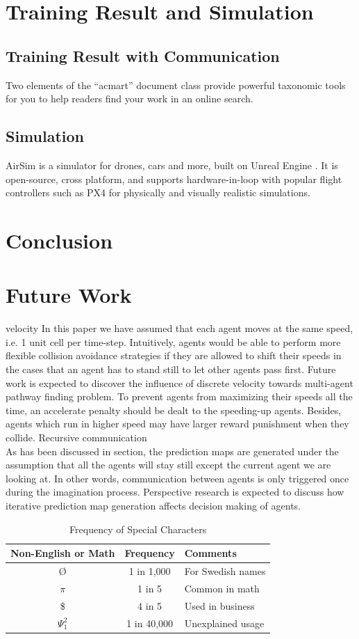 \documentclass[sigconf,authordraft, nonacm=true]{acmart}
\begin{document}
\section{Training Result and Simulation}
\subsection{Training Result with Communication}
Two elements of the ``acmart'' document class provide powerful
taxonomic tools for you to help readers find your work in an online
search.
\subsection{Simulation}
AirSim is a simulator for drones, cars and more, built on Unreal Engine . It is open-source, cross platform, and supports hardware-in-loop with popular flight controllers such as PX4 for physically and visually realistic simulations. 

\section{Conclusion}


\section{Future Work}
velocity
In this paper we have assumed that each agent moves at the same speed, i.e. 1 unit cell per time-step. Intuitively, agents would be able to perform more flexible collision avoidance strategies if they are allowed to shift their speeds in the cases that an agent has to stand still to let other agents pass first. Future work is expected to discover the influence of discrete velocity towards multi-agent pathway finding problem. To prevent agents from maximizing their speeds all the time, an accelerate penalty should be dealt to the speeding-up agents. Besides, agents which run in higher speed may have larger reward punishment when they collide.
Recursive communication
\\As has been discussed in section, the prediction maps are generated under the assumption that all the agents will stay still except the current agent we are looking at. In other words, communication between agents is only triggered once during the imagination process. Perspective research is expected to discuss how iterative prediction map generation affects decision making of agents.


\begin{table}
  \caption{Frequency of Special Characters}
  \label{tab:freq}
  \begin{tabular}{ccl}
    \toprule
    Non-English or Math&Frequency&Comments\\
    \midrule
    \O & 1 in 1,000& For Swedish names\\
    $\pi$ & 1 in 5& Common in math\\
    \$ & 4 in 5 & Used in business\\
    $\Psi^2_1$ & 1 in 40,000& Unexplained usage\\
  \bottomrule
\end{tabular}
\end{table}
\end{document}

